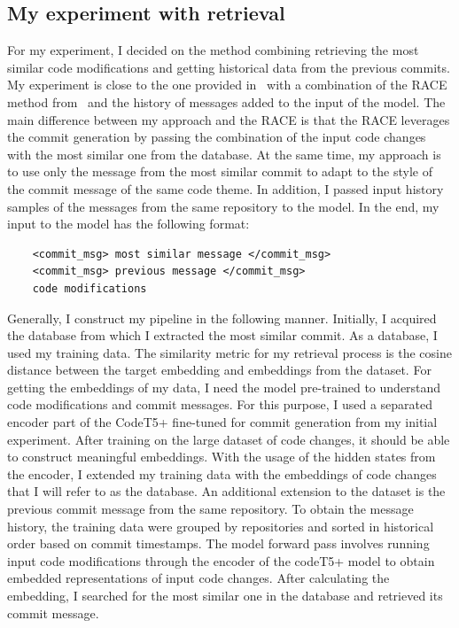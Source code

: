 \subsection{My experiment with retrieval}\label{subsec:retrieval_arch_method}
For my experiment, I decided on the method combining retrieving the most similar code modifications and getting historical data from the previous commits. My experiment is close to the one provided in~\cite{eliseeva2023commit} with a combination of the RACE method from~\cite{shi2022race} and the history of messages added to the input of the model. The main difference between my approach and the RACE is that the RACE leverages the commit generation by passing the combination of the input code changes with the most similar one from the database. At the same time, my approach is to use only the message from the most similar commit to adapt to the style of the commit message of the same code theme.  In addition, I passed input history samples of the messages from the same repository to the model. In the end, my input to the model has the following format:  
\begin{verbatim}
    <commit_msg> most similar message </commit_msg> 
    <commit_msg> previous message </commit_msg>
    code modifications 
\end{verbatim}
Generally, I construct my pipeline in the following manner. Initially, I acquired the database from which I extracted the most similar commit. As a database, I used my training data. The similarity metric for my retrieval process is the cosine distance between the target embedding and embeddings from the dataset. For getting the embeddings of my data, I need the model pre-trained to understand code modifications and commit messages. For this purpose, I used a separated encoder part of the CodeT5+ fine-tuned for commit generation from my initial experiment. After training on the large dataset of code changes, it should be able to construct meaningful embeddings. With the usage of the hidden states from the encoder, I extended my training data with the embeddings of code changes that I will refer to as the database. An additional extension to the dataset is the previous commit message from the same repository. To obtain the message history, the training data were grouped by repositories and sorted in historical order based on commit timestamps. The model forward pass involves running input code modifications through the encoder of the codeT5+ model to obtain embedded representations of input code changes. After calculating the embedding, I searched for the most similar one in the database and retrieved its commit message.

